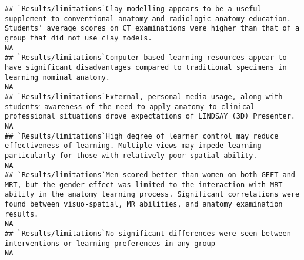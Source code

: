 \documentclass[]{article}
\begin{document}
\begin{verbatim}
## `Results/limitations`Clay modelling appears to be a useful supplement to conventional anatomy and radiologic anatomy education. Students’ average scores on CT examinations were higher than that of a group that did not use clay models.                                                                                                                                                                                                                                              NA
## `Results/limitations`Computer-based learning resources appear to have significant disadvantages compared to traditional specimens in learning nominal anatomy.                                                                                                                                                                                                                                                                                                                          NA
## `Results/limitations`External, personal media usage, along with students׳ awareness of the need to apply anatomy to clinical professional situations drove expectations of LINDSAY (3D) Presenter.                                                                                                                                                                                                                                                                                      NA
## `Results/limitations`High degree of learner control may reduce effectiveness of learning. Multiple views may impede learning particularly for those with relatively poor spatial ability.                                                                                                                                                                                                                                                                                               NA
## `Results/limitations`Men scored better than women on both GEFT and MRT, but the gender effect was limited to the interaction with MRT ability in the anatomy learning process. Significant correlations were found between visuo-spatial, MR abilities, and anatomy examination results.                                                                                                                                                                                                NA
## `Results/limitations`No significant differences were seen between interventions or learning preferences in any group                                                                                                                                                                                                                                                                                                                                                                    NA

\end{verbatim}
\end{document}
